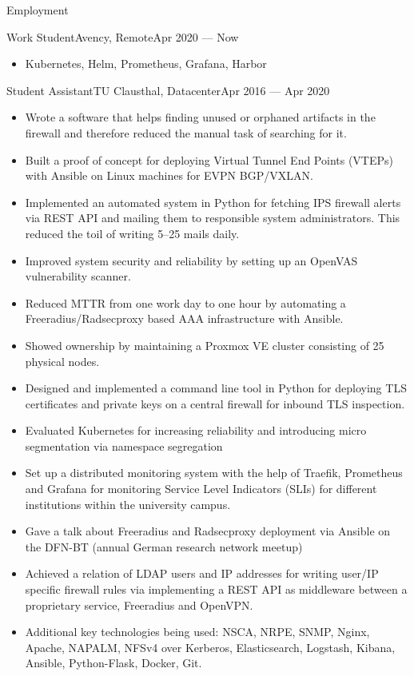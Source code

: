 \documentclass[]{mcdowellcv}
\begin{document}
\makeheader

\begin{cvsection}{Employment}
\begin{cvsubsection}{Work Student}{Avency, Remote}{Apr 2020 --- Now}
\begin{itemize}
\item Kubernetes, Helm, Prometheus, Grafana, Harbor
\end{itemize}
\end{cvsubsection}
\begin{cvsubsection}{Student Assistant}{TU Clausthal, Datacenter}{Apr 2016 --- Apr 2020}

\begin{itemize}
\item Wrote a software that helps finding unused or orphaned artifacts in the firewall and therefore reduced the manual task of searching for it.
\item Built a proof of concept for deploying Virtual Tunnel End Points (VTEPs) with Ansible on Linux machines for EVPN BGP/VXLAN.
\item Implemented an automated system in Python for fetching IPS firewall alerts via REST API and mailing them to responsible system administrators. This reduced the toil of writing 5--25 mails daily.
\item Improved system security and reliability by setting up an OpenVAS vulnerability scanner.
\item Reduced MTTR from one work day to one hour by automating a Freeradius/Radsecproxy based AAA infrastructure with Ansible.
\item Showed ownership by maintaining a Proxmox VE cluster consisting of 25 physical nodes.
\item Designed and implemented a command line tool in Python for deploying TLS certificates and private keys on a central firewall for inbound TLS inspection.
\item Evaluated Kubernetes for increasing reliability and introducing micro segmentation via namespace segregation
\item Set up a distributed monitoring system with the help of Traefik, Prometheus and Grafana for monitoring Service Level Indicators (SLIs) for different institutions within the university campus.
\item Gave a talk about Freeradius and Radsecproxy deployment via Ansible on the DFN-BT (annual German research network meetup) 
\item Achieved a relation of LDAP users and IP addresses for writing user/IP specific firewall rules via implementing a REST API as middleware between a proprietary service, Freeradius and OpenVPN.
\item Additional key technologies being used: NSCA, NRPE, SNMP, Nginx, Apache, NAPALM, NFSv4 over Kerberos, Elasticsearch, Logstash, Kibana, Ansible, Python-Flask, Docker, Git.
\end{itemize}
\end{cvsubsection}


\end{cvsection}
\end{document}
